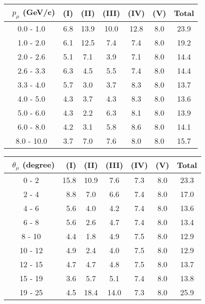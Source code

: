 \documentclass[aps, prd, reprint,showpacs,  preprintnumbers,amsmath,amssymb,superscriptaddress, nofootinbib]{revtex4-1}
\makeatletter
\renewenvironment{table}
  {\def\@captype{table}}
  {}
\makeatother
\begin{document}
\begin{table}
\centering
\begin{tabular}{crccccc}
\hline
~$p_{\mu}$ (GeV/c) & (I) & (II) & (III) & (IV) & (V) & Total \\
\hline
 0.0 -  1.0  & 6.8   &13.9   &10.0   &12.8   & 8.0   &23.9 \\
 1.0 -  2.0  & 6.1   &12.5   & 7.4   & 7.4   & 8.0   &19.2 \\
 2.0 -  2.6  & 5.1   & 7.1   & 3.9   & 7.1   & 8.0   &14.4 \\
 2.6 -  3.3  & 6.3   & 4.5   & 5.5   & 7.4   & 8.0   &14.4 \\
 3.3 -  4.0  & 5.7   & 3.0   & 3.7   & 8.3   & 8.0   &13.7 \\
 4.0 -  5.0  & 4.3   & 3.7   & 4.3   & 8.3   & 8.0   &13.6 \\
 5.0 -  6.0  & 4.3   & 2.2   & 6.3   & 8.1   & 8.0   &13.9 \\
 6.0 -  8.0  & 4.2   & 3.1   & 5.8   & 8.6   & 8.0   &14.1 \\
 8.0 - 10.0  & 3.7   & 7.0   & 7.6   & 8.0   & 8.0   &15.7 \\
\hline
\hline
\end{tabular}
\caption{Fractional systematic uncertainties (in percent) on $d\sigma/dp_{\mu}$.}
\label{tb:pi0_mup_err}
\end{table}


\vspace{1cm}


\begin{table}
\centering
\begin{tabular}{crccccc}
\hline
~$\theta_{\mu}$ (degree) & (I) & (II) & (III) & (IV) & (V) & Total \\
\hline
 0 -  2  &15.8   &10.9  & 7.6   & 7.3   & 8.0   &23.3 \\
 2 -  4  & 8.8   & 7.0  & 6.6   & 7.4   & 8.0   &17.0 \\
 4 -  6  & 5.6   & 4.0  & 4.2   & 7.4   & 8.0   &13.6 \\
 6 -  8  & 5.6   & 2.6  & 4.7   & 7.4   & 8.0   &13.4 \\
 8 - 10  & 4.4   & 1.8  & 4.9   & 7.5   & 8.0   &12.9 \\
10 - 12  & 4.9   & 2.4  & 4.0   & 7.5   & 8.0   &12.9 \\
12 - 15  & 4.7   & 4.7  & 4.8   & 7.5   & 8.0   &13.7 \\
15 - 19  & 3.6   & 5.7  & 5.1   & 7.4   & 8.0   &13.8 \\
19 - 25  & 4.5   &18.4  &14.0   & 7.3   & 8.0   &25.9 \\
\hline
\hline
\end{tabular}
\caption{Fractional systematic uncertainties (in percent) on $d\sigma/d\theta_\mu$.}
\label{tb:pi0_muth_err}
\end{table}
\end{document}
